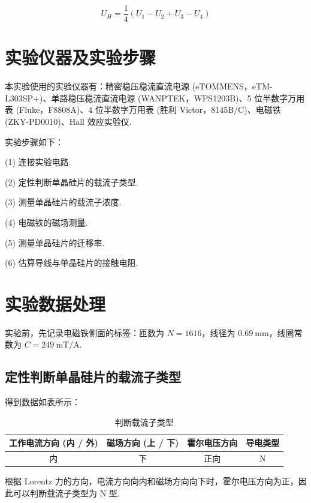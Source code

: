 \documentclass{customDoc}
\begin{document}
\begin{equation}
    U_H = \frac{1}{4}(U_1 - U_2 + U_3 - U_4)
\end{equation}

\section{实验仪器及实验步骤}

本实验使用的实验仪器有：精密稳压稳流直流电源 (eTOMMENS，eTM-L303SP+)、单路稳压稳流直流电源 (WANPTEK，WPS1203B)、5 位半数字万用表 (Fluke，F8808A)、4 位半数字万用表 (胜利 Victor，8145B/C)、电磁铁 (ZKY-PD0010)、Hall 效应实验仪.
\newline

实验步骤如下：

(1) 连接实验电路.

(2) 定性判断单晶硅片的载流子类型.

(3) 测量单晶硅片的载流子浓度.

(4) 电磁铁的磁场测量.

(5) 测量单晶硅片的迁移率.

(6) 估算导线与单晶硅片的接触电阻.

\section{实验数据处理}

实验前，先记录电磁铁侧面的标签：匝数为 $N=1616$，线径为 $\SI{0.69}{\milli\meter}$，线圈常数为 $C=\SI{249}{\milli\tesla/\ampere}$.

\subsection{定性判断单晶硅片的载流子类型}

得到数据如表所示：

\begin{table}[H]
  \centering
  \caption{判断载流子类型}
    \begin{tabular}{|c|c|c|c|}
    \hline
    工作电流方向 (内 / 外) & 磁场方向 (上 / 下) & 霍尔电压方向 & 导电类型 \\
    \hline
    内     & 下     & 正向    & N \\
    \hline
    \end{tabular}
\end{table}

根据 Lorentz 力的方向，电流方向向内和磁场方向向下时，霍尔电压方向为正，因此可以判断载流子类型为 N 型.
\end{document}
